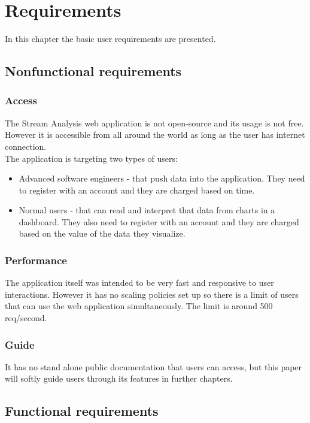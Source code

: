 \chapter{Requirements}
\label{chap:02}
In this chapter the basic user requirements are presented.

\section{Nonfunctional requirements}
\label{chap:02:01}

\subsection{Access}
\label{chap:02:01:01}
The Stream Analysis web application is not open-source and its usage is not free. However it is accessible from all around the world as long as the user has internet connection.\\

The application is targeting two types of users:
\begin{itemize}
	\item Advanced software engineers - that push data into the application. They need to register with an account and they are charged based on time.
	\item Normal users - that can read and interpret that data from charts in a dashboard. They also need to register with an account and they are charged based on the value of the data they visualize.
\end{itemize}

\subsection{Performance}
\label{chap:02:01:02}
The application itself was intended to be very fast and responsive to user interactions. However it has no scaling policies set up so there is a limit of users that can use the web application simultaneously. The limit is around 500 req/second.

\subsection{Guide}
\label{chap:02:01:03}
It has no stand alone public documentation that users can access, but this paper will softly guide users through its features in further chapters.


\section{Functional requirements}
\label{chap:02:02}

